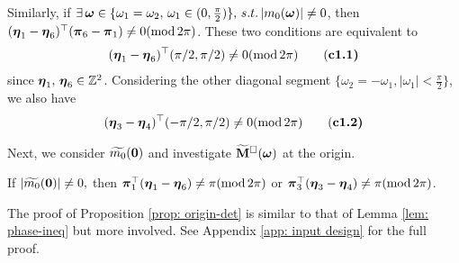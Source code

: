 Similarly, if $\exists\,\boldsymbol{\omega}\in \{\omega_1 = \omega_2,\, \omega_1\in(0,\frac{\pi}{2})\},\, s.t.\, |m_0(\boldsymbol{\omega})| \neq 0$, then $(\boldsymbol{\eta}_1-\boldsymbol{\eta}_6)^\top (\boldsymbol{\pi}_6-\boldsymbol{\pi}_1)\neq 0(\text{mod}\,2\pi)$. These two conditions are equivalent to 
\begin{align*}
(\boldsymbol{\eta}_1-\boldsymbol{\eta}_6)^\top(\pi/2,\pi/2)\neq 0 (\text{mod}\,2\pi)\tag{\bf c1.1}
\end{align*}
since $\boldsymbol{\eta}_1,\,\boldsymbol{\eta}_6\in\mathbb{Z}^2$.
Considering the other diagonal segment $\{\omega_2 = -\omega_1, |\omega_1| <\frac{\pi}{2}\}$, we also have 
\begin{align*}
(\boldsymbol{\eta}_3-\boldsymbol{\eta}_4)^\top(-\pi/2,\pi/2)\neq 0 (\text{mod}\, 2\pi)\tag{\bf c1.2}
\end{align*}

Next, we consider $\widetilde{m_0}(\boldsymbol{0})$ and investigate $\widetilde{\mathbf{M}}^{\Box}(\boldsymbol{\omega})$ at the origin.
\begin{proposition}\label{prop: origin-det}
If $|\widetilde{m_0}(\boldsymbol{0})|\neq 0,$ then $\boldsymbol{\pi}_1^\top(\boldsymbol{\eta}_1-\boldsymbol{\eta}_6)\neq \pi(\text{mod}\,2\pi)$ or $\boldsymbol{\pi}_3^\top(\boldsymbol{\eta}_3-\boldsymbol{\eta}_4)\neq \pi(\text{mod}\,2\pi)$. 
\end{proposition}
The proof of Proposition \ref{prop: origin-det} is similar to that of Lemma \ref{lem: phase-ineq} but more involved. See Appendix \ref{app: input design} for the full proof.

